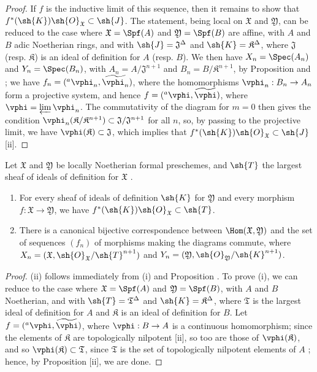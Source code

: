 \begin{proof}
If $f$ is the inductive limit of this sequence, then it remains to show that $f^*(\sh{K})\sh{O}_\mathfrak{X}\subset\sh{J}$.
The statement, being local on $\mathfrak{X}$ and $\mathfrak{Y}$, can be reduced to the case where $\mathfrak{X}=\Spf(A)$ and $\mathfrak{Y}=\Spf(B)$ are affine, with $A$ and $B$ adic Noetherian rings, and with $\sh{J}=\mathfrak{J}^\Delta$ and $\sh{K}=\mathfrak{K}^\Delta$, where $\mathfrak{J}$ (resp. $\mathfrak{K}$) is an ideal of definition for $A$ (resp. $B$).
We then have $X_n=\Spec(A_n)$ and $Y_n=\Spec(B_n)$, with $A_n=A/\mathfrak{J}^{n+1}$ and $B_n=B/\mathfrak{K}^{n+1}$, by Proposition  and ; we have $f_n=({}^a\vphi_n,\widetilde{\vphi_n})$, where the homomorphisms $\vphi_n:B_n\to A_n$ form a projective system, and hence $f=({}^a\vphi,\widetilde{\vphi})$, where $\vphi=\varprojlim\vphi_n$.
The commutativity of the diagram  for $m=0$ then gives the condition $\vphi_n(\mathfrak{K}/\mathfrak{K}^{n+1})\subset\mathfrak{J}/\mathfrak{J}^{n+1}$ for all $n$, so, by passing to the projective limit, we have $\vphi(\mathfrak{K})\subset\mathfrak{J}$, which implies that $f^*(\sh{K})\sh{O}_\mathfrak{X}\subset\sh{J}$ [ii].
\end{proof}

\begin{corollary}[10.6.10]
\label{I.10.6.10}
Let $\mathfrak{X}$ and $\mathfrak{Y}$ be locally Noetherian formal preschemes, and $\sh{T}$ the largest sheaf of ideals of definition for $\mathfrak{X}$ .
\begin{enumerate}
  \item[\rm{(i)}] For every sheaf of ideals of definition $\sh{K}$ for $\mathfrak{Y}$ and every morphism $f:\mathfrak{X}\to\mathfrak{Y}$, we have $f^*(\sh{K})\sh{O}_\mathfrak{X}\subset\sh{T}$.
  \item[\rm{(ii)}] There is a canonical bijective correspondence between $\Hom(\mathfrak{X},\mathfrak{Y})$ and the set of sequences $(f_n)$ of morphisms making the diagrams  commute, where $X_n=(\mathfrak{X},\sh{O}_\mathfrak{X}/\sh{T}^{n+1})$ and $Y_n=(\mathfrak{Y},\sh{O}_\mathfrak{Y}/\sh{K}^{n+1})$.
\end{enumerate}
\end{corollary}

\begin{proof}
(ii) follows immediately from (i) and Proposition .
To prove (i), we can reduce to the case where $\mathfrak{X}=\Spf(A)$ and $\mathfrak{Y}=\Spf(B)$, with $A$ and $B$ Noetherian, and with $\sh{T}=\mathfrak{T}^\Delta$ and $\sh{K}=\mathfrak{K}^\Delta$, where $\mathfrak{T}$ is the largest ideal of definition for $A$ and $\mathfrak{K}$ is an ideal of definition for $B$.
Let $f=({}^a\vphi,\widetilde{\vphi})$, where $\vphi:B\to A$ is a continuous homomorphism; since the elements of $\mathfrak{K}$ are topologically nilpotent [ii], so too are those of $\vphi(\mathfrak{K})$, and so $\vphi(\mathfrak{K})\subset\mathfrak{T}$, since $\mathfrak{T}$ is the set of topologically nilpotent elements of $A$ ; hence, by Proposition [ii], we are done.
\end{proof}

